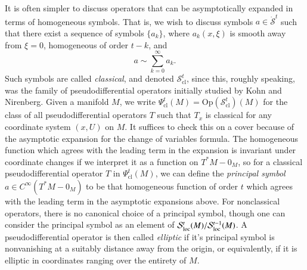 It is often simpler to discuss operators that can be asymptotically expanded in terms of homogeneous symbols. That is, we wish to discuss symbols $a \in \dot{\mathcal{S}}^t$ such that there exist a sequence of symbols $\{ a_k \}$, where $a_k(x,\xi)$ is smooth away from $\xi = 0$, homogeneous of order $t - k$, and
%
\[ a \sim \sum_{k = 0}^\infty a_k. \]
%
Such symbols are called \emph{classical}, and denoted $\mathcal{S}^t_{\text{cl}}$, since this, roughly speaking, was the family of pseudodifferential operators initially studied by Kohn and Nirenberg. Given a manifold $M$, we write $\Psi_{\text{cl}}^t(M) = \text{Op}(\mathcal{S}^t_{\text{cl}})(M)$ for the class of all pseudodifferential operators $T$ such that $T_x$ is classical for any coordinate system $(x,U)$ on $M$. It suffices to check this on a cover because of the asymptotic expansion for the change of variables formula. The homogeneous function which agrees with the leading term in the expansion is invariant under coordinate changes if we interpret it as a function on $T^* M - 0_M$, so for a classical pseudodifferential operator $T$ in $\Psi_{\text{cl}}^t(M)$, we can define the \emph{principal symbol} $a \in C^\infty(T^* M - 0_M)$ to be that homogeneous function of order $t$ which agrees with the leading term in the asymptotic expansions above. For nonclassical operators, there is no canonical choice of a principal symbol, though one can consider the principal symbol as an element of $\mathcal{S}^t_{\text{loc}}(M) / \mathcal{S}^{t-1}_{\text{loc}}(M)$. A pseudodifferential operator is then called \emph{elliptic} if it's principal symbol is nonvanishing at a suitably distance away from the origin, or equivalently, if it is elliptic in coordinates ranging over the entirety of $M$.

